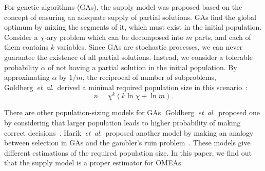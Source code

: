 \documentclass{sig-alternate}
\begin{document}
For genetic algorithms (GAs), the supply model was proposed based on the concept of 
ensuring an adequate supply of partial solutions.
GAs find the global optimum by mixing the segments of it,
which must exist in the initial population.
Consider a $\chi$-ary problem which can be decomposed into $m$ parts,
and each of them contains $k$ variables.
Since GAs are stochastic processes, we can never guarantee the existence of all partial solutions.
Instead, we consider a tolerable probability $\alpha$ of not having a partial solution in the initial population.
By approximating $\alpha$ by $1/m$, the reciprocal of number of subproblems, 
Goldberg~{\it et~al}.\ derived a minimal required population size in this scenario~\cite{2001_Supply}:
\begin{equation}\label{eq:goldbergSupply}
n=\chi^k\left(k\ln\chi+\ln m\right).
\end{equation}

There are other population-sizing models for GAs.
Goldberg~{\it et~al}.\ proposed one by considering that
larger population leads to higher probability of making correct decisions~\cite{1992_Goldberg}.
Harik~{\it et~al}.\ proposed another model by making an analogy
between selection in GAs and the gambler's ruin problem~\cite{1999_Gamblers}.
These models give different estimations of the required population size.
In this paper, we find out that the supply model is a proper estimator for OMEAs.

\end{document}
